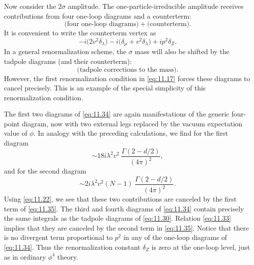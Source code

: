 Now consider the $2\sigma$ amplitude.  The one-particle-irreducible amplitude
receives contributions from four one-loop diagrams and a counterterm:
\begin{equation}
  \text{(four one-loop diagrams)} + \text{(counterterm)} .
  \label{eq:11.34}
\end{equation}
It is convenient to write the counterterm vertex as
\begin{equation}
  -i\bigl( 2v^2\delta_\lambda \bigr) - i\bigl( \delta_\mu + v^2\delta_\lambda
    \bigr) + ip^2\delta_Z .
  \label{eq:11.35}
\end{equation}
In a general renormalization scheme, the $\sigma$ mass will also be shifted by
the tadpole diagrams (and their counterterm):
\begin{equation}
  \text{(tadpole corrections to the mass)} .
  \label{eq:11.36}
\end{equation}
However, the first renormalization condition in \eqref{eq:11.17} forces these
diagrams to cancel precisely.  This is an example of the special simplicity of
this renormalization condition.

The first two diagrams of \eqref{eq:11.34} are again manifestations of the
generic four-point diagram, now with two external legs replaced by the vacuum
expectation value of $\phi$.  In analogy with the preceding calculations, we
find for the first diagram
\begin{equation}
  \sim 18i\lambda^2v^2\ \frac{\Gamma(2-d/2)}{(4\pi)^2} ,
\end{equation}
and for the second diagram
\begin{equation}
  \sim 2i\lambda^2v^2(N-1)\ \frac{\Gamma(2-d/2)}{(4\pi)^2} .
\end{equation}
Using \eqref{eq:11.22}, we see that these two contributions are canceled by
the first term of \eqref{eq:11.35}.  The third and fourth diagrams of
\eqref{eq:11.34} contain precisely the same integrals as the tadpole diagrams
of \eqref{eq:11.30}.  Relation \eqref{eq:11.33} implies that they are
canceled by the second term in \eqref{eq:11.35}.  Notice that there is no
divergent term proportional to $p^2$ in any of the one-loop diagrams of
\eqref{eq:11.34}.  Thus the renormalization constant $\delta_Z$ is zero at the
one-loop level, just as in ordinary $\phi^4$ theory.

